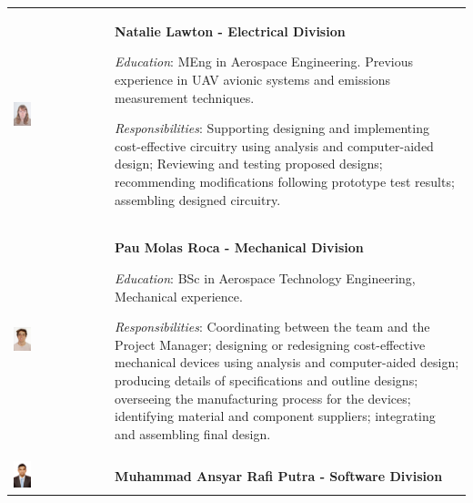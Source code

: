 \documentclass[a4paper,12pt,twoside]{article}
\begin{document}
\begin{longtable}[]{m{} m{}}
\includegraphics[width=0.2\textwidth]{1-introduction/img/natalie-lawton.jpg} & \textbf{Natalie Lawton - Electrical Division}

\smallskip
\textit{Education}: MEng in Aerospace Engineering. Previous experience in UAV avionic systems and emissions measurement techniques.

\smallskip
\textit{Responsibilities}: Supporting designing and implementing cost-effective circuitry using analysis and computer-aided design; Reviewing and testing proposed designs; recommending modifications following prototype test results; assembling designed circuitry. 
\bigskip
\\

\includegraphics[width=0.2\textwidth]{1-introduction/img/pau-molas-roca.jpg} & \textbf{Pau Molas Roca - Mechanical Division}

\smallskip
\textit{Education}: BSc in Aerospace Technology Engineering, Mechanical experience.

\smallskip
\textit{Responsibilities}: Coordinating between the team and the Project Manager; designing or redesigning cost-effective mechanical devices using analysis and computer-aided design; producing details of specifications and outline designs; overseeing the manufacturing process for the devices; identifying material and component suppliers; integrating and assembling final design.   \bigskip
\\

\includegraphics[width=0.2\textwidth]{1-introduction/img/muhammad-ansyar-rafi-putra.jpg} & \textbf{Muhammad Ansyar Rafi Putra - Software Division}


\end{longtable}
\end{document}
